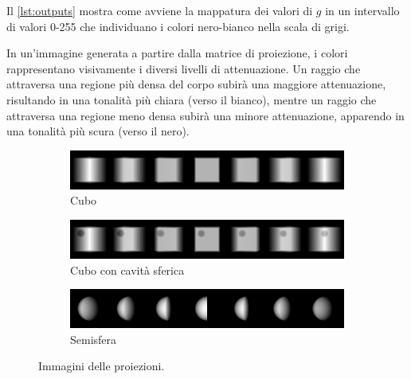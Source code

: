 \documentclass[12pt,a4paper]{report}
\begin{document}
Il \autoref{lst:outputs} mostra come avviene la mappatura dei valori di \(g\) in un intervallo di valori 0-255 che individuano i
colori nero-bianco nella scala di grigi.

In un'immagine generata a partire dalla matrice di proiezione, i colori rappresentano visivamente i diversi livelli di
attenuazione.
Un raggio che attraversa una regione più densa del corpo subirà una maggiore attenuazione, risultando in una tonalità più chiara
(verso il bianco), mentre un raggio che attraversa una regione meno densa subirà una minore attenuazione, apparendo in una
tonalità più scura (verso il nero).

\begin{figure}[H]
  \centering
  \begin{subfigure}{\textwidth}
    \centering
    \includegraphics[width=\textwidth]{Cube}
    \caption{Cubo}
  \end{subfigure}
  \begin{subfigure}{\textwidth}
    \centering
    \includegraphics[width=\textwidth]{CubeWithSphericalHole}
    \caption{Cubo con cavità sferica}
  \end{subfigure}
  \begin{subfigure}{\textwidth}
    \centering
    \includegraphics[width=\textwidth]{HalfSphere}
    \caption{Semisfera}
  \end{subfigure}
  \caption{\label{fig:projection_images} Immagini delle proiezioni.}
\end{figure}
\end{document}
